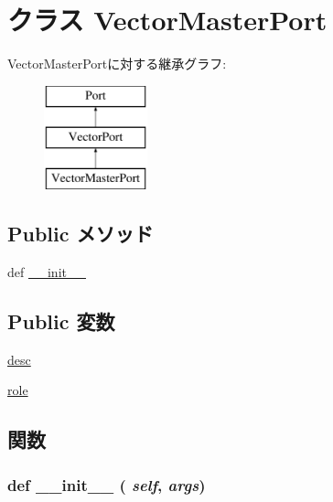 \hypertarget{classm5_1_1params_1_1VectorMasterPort}{
\section{クラス VectorMasterPort}
\label{classm5_1_1params_1_1VectorMasterPort}
}
VectorMasterPortに対する継承グラフ:\begin{figure}[H]
\begin{center}
\leavevmode
\includegraphics[height=3cm]{classm5_1_1params_1_1VectorMasterPort}
\end{center}
\end{figure}
\subsection*{Public メソッド}
\begin{DoxyCompactItemize}
\item 
def \hyperlink{classm5_1_1params_1_1VectorMasterPort_ac775ee34451fdfa742b318538164070e}{\_\-\_\-init\_\-\_\-}
\end{DoxyCompactItemize}
\subsection*{Public 変数}
\begin{DoxyCompactItemize}
\item 
\hyperlink{classm5_1_1params_1_1VectorMasterPort_aafc566bb08a9f46485e7238669581c2b}{desc}
\item 
\hyperlink{classm5_1_1params_1_1VectorMasterPort_a4e0cdb878325d53ad79a74504bf97a96}{role}
\end{DoxyCompactItemize}


\subsection{関数}
\hypertarget{classm5_1_1params_1_1VectorMasterPort_ac775ee34451fdfa742b318538164070e}{
\subsubsection[{\_\-\_\-init\_\-\_\-}]{\setlength{\rightskip}{0pt plus 5cm}def \_\-\_\-init\_\-\_\- ( {\em self}, \/   {\em args})}}
\label{classm5_1_1params_1_1VectorMasterPort_ac775ee34451fdfa742b318538164070e}


